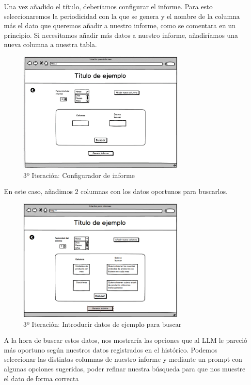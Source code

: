 Una vez añadido el título, deberíamos configurar el informe. Para esto seleccionaremos la periodicidad con la que se genera y el nombre de la columna más el dato que queremos añadir a nuestro informe, como se comentara en un principio. Si necesitamos añadir más datos a nuestro informe, añadiríamos una nueva columna a nuestra tabla.

\begin{figure}[hp!]
    \centering
    \includegraphics[width=0.75\textwidth]{imaxes/iteracion3.2.png}
    \caption{3º Iteración: Configurador de informe}
    \label{fig:iteracion3.2}
\end{figure}

En este caso, añadimos 2 columnas con los datos oportunos para buscarlos.

\begin{figure}[hp!]
    \centering
    \includegraphics[width=0.75\textwidth]{imaxes/iteracion3.3.png}
    \caption{3º Iteración: Introducir datos de ejemplo para buscar}
    \label{fig:iteracion3.3}
\end{figure}

A la hora de buscar estos datos, nos mostraría las opciones que al LLM le pareció más oportuno según nuestros datos registrados en el histórico. Podemos seleccionar las distintas columnas de nuestro informe y mediante un prompt con algunas opciones sugeridas, poder refinar nuestra búsqueda para que nos muestre el dato de forma correcta


